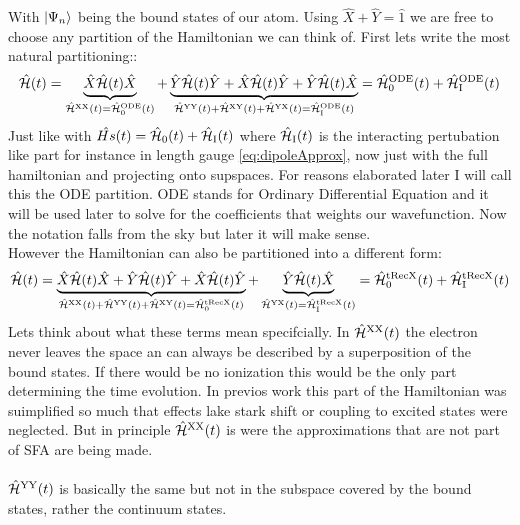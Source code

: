 With $\ket{\Psi_n}$ being the bound states of our atom. Using $\hat{X}+\hat{Y}=\hat{1}$ we are free to choose any partition of the Hamiltonian we can think of.
First lets write the most natural partitioning::
\begin{equation*}
    \hat{\mathcal{H}}(t) = \underbrace{\hat{X}\hat{\mathcal{H}}(t)\hat{X}}_{\hat{\mathcal{H}}^{\mathrm{XX}}(t)=\hat{\mathcal{H}}^{\mathrm{ODE}}_0(t)} + \underbrace{\hat{Y}\hat{\mathcal{H}}(t)\hat{Y} + \hat{X}\hat{\mathcal{H}}(t)\hat{Y} + \hat{Y}\hat{\mathcal{H}}(t)\hat{X}}_{\hat{\mathcal{H}}^{\mathrm{YY}}(t)+\hat{\mathcal{H}}^{\mathrm{XY}}(t)+\hat{\mathcal{H}}^{\mathrm{YX}}(t)=\hat{\mathcal{H}}^{\mathrm{ODE}}_{\mathrm{I}}(t)} = \hat{\mathcal{H}}^{\mathrm{ODE}}_0(t)+\hat{\mathcal{H}}^{\mathrm{ODE}}_{\mathrm{I}}(t)
\end{equation*}
Just like with $\hat{Hs}(t)=\hat{\mathcal{H}}_0(t)+\hat{\mathcal{H}}_\mathrm{I}(t)$ where $\hat{\mathcal{H}}_\mathrm{I}(t)$ is the interacting pertubation like part for instance in length gauge \eqref{eq:dipoleApprox}, now just with the full hamiltonian and projecting onto supspaces. 
For reasons elaborated later I will call this the ODE partition. 
ODE stands for Ordinary Differential Equation and it will be used later to solve for the coefficients that weights our wavefunction.
Now the notation falls from the sky but later it will make sense.\\
However the Hamiltonian can also be partitioned into a different form:
\begin{equation*}
    \hat{\mathcal{H}}(t) = \underbrace{\hat{X}\hat{\mathcal{H}}(t)\hat{X} + \hat{Y}\hat{\mathcal{H}}(t)\hat{Y} + \hat{X}\hat{\mathcal{H}}(t)\hat{Y}}_{\hat{\mathcal{H}}^{\mathrm{XX}}(t)+\hat{\mathcal{H}}^{\mathrm{YY}}(t)+\hat{\mathcal{H}}^{\mathrm{XY}}(t)=\hat{\mathcal{H}}^{\mathrm{tRecX}}_0(t)} + \underbrace{\hat{Y}\hat{\mathcal{H}}(t)\hat{X}}_{\hat{\mathcal{H}}^{\mathrm{YX}}(t) = \hat{\mathcal{H}}^{\mathrm{tRecX}}_{\mathrm{I}}(t)} = \hat{\mathcal{H}}^{\mathrm{tRecX}}_0(t)+\hat{\mathcal{H}}^{\mathrm{tRecX}}_{\mathrm{I}}(t)
\end{equation*}
Lets think about what these terms mean specifcially. 
In $\hat{\mathcal{H}}^{\mathrm{XX}}(t)$ the electron never leaves the space an can always be described by a superposition of the bound states.
If there would be no ionization this would be the only part determining the time evolution.
In previos work this part of the Hamiltonian was suimplified so much that effects lake stark shift or coupling to excited states were neglected.
But in principle $\hat{\mathcal{H}}^{\mathrm{XX}}(t)$ is were the approximations that are not part of SFA are being made.\\\\
$\hat{\mathcal{H}}^{\mathrm{YY}}(t)$ is basically the same but not in the subspace covered by the bound states, rather the continuum states.
